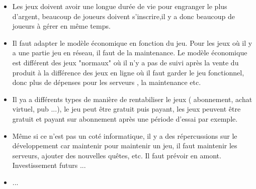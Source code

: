 \documentclass[11pt,a4paper]{article}
\begin{document}
	
  \begin{itemize}
  \renewcommand{\labelitemi}{$\Rightarrow$}
	\item Les jeux doivent avoir une longue durée de vie pour engranger le plus d'argent, beaucoup de joueurs doivent s'inscrire,il y a donc beaucoup de joueurs à gérer en même temps.
	\item Il  faut adapter le modèle économique en fonction du jeu. Pour les jeux où il y a une partie jeu en réseau, il faut de la maintenance. Le  modèle économique est différent des jeux "normaux" où il n'y a pas de suivi après la vente du produit à la différence des jeux en ligne où il faut garder le jeu fonctionnel, donc plus de dépenses pour les serveurs , la maintenance etc.
	\item Il ya a différents types de manière de rentabiliser le jeux ( abonnement, achat virtuel, pub ...), le jeu peut être gratuit puis payant, les jeux peuvent être gratuit et payant sur abonnement après une période d'essai par exemple.
	\item Même si ce n'est pas un coté informatique, il y a des répercussions sur le développement car maintenir pour maintenir un jeu, il faut maintenir les serveurs, ajouter des nouvelles quêtes, etc. Il faut prévoir en amont. Investissement futurs ...
	\item ...
  \end{itemize}
\end{document}
